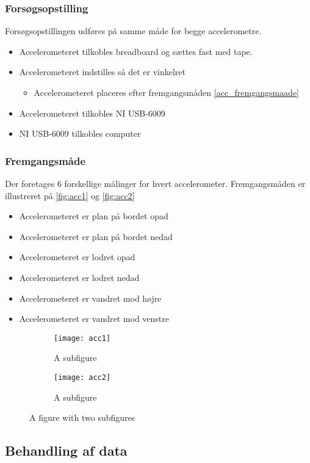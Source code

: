 \subsubsection{Forsøgsopstilling}
Forsøgsopstillingen udføres på samme måde for begge accelerometre.
\begin{itemize}
\item Accelerometeret tilkobles breadboard og sættes fast med tape.
\item Accelerometeret indstilles så det er vinkelret
\begin{itemize}
\item Accelerometeret placeres efter fremgangsmåden \autoref{acc_fremgangsmaade}
\end{itemize}
\item Accelerometeret tilkobles NI USB-6009
\item NI USB-6009 tilkobles computer
\end{itemize}

\subsubsection{Fremgangsmåde} \label{acc_fremgangsmaade}
Der foretages 6 forskellige målinger for hvert accelerometer. Fremgangsmåden er illustreret på \autoref{fig:acc1} og \autoref{fig:acc2}
\begin{itemize}
\item Accelerometeret er plan på bordet opad
\item Accelerometeret er plan på bordet nedad
\item Accelerometeret er lodret opad
\item Accelerometeret er lodret nedad
\item Accelerometeret er vandret mod højre
\item Accelerometeret er vandret mod venstre
\end{itemize}

\begin{figure}
\centering
\begin{subfigure}{.5\textwidth}
  \centering
  \texttt{[image: acc1]}
  \caption{A subfigure}
  \label{fig:acc1}
\end{subfigure}%
\begin{subfigure}{.5\textwidth}
  \centering
  \texttt{[image: acc2]}
  \caption{A subfigure}
  \label{fig:acc2}
\end{subfigure}
\caption{A figure with two subfigures}
\label{fig:test}
\end{figure}



\subsection{Behandling af data}
